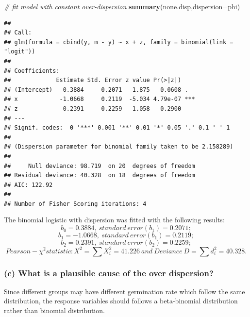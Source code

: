 \documentclass[
]{article}
\newenvironment{Shaded}{\begin{snugshade}}{\end{snugshade}}
\newcommand{\AttributeTok}[1]{\textcolor[rgb]{0.13,0.29,0.53}{#1}}
\newcommand{\CommentTok}[1]{\textcolor[rgb]{0.56,0.35,0.01}{\textit{#1}}}
\newcommand{\FunctionTok}[1]{\textcolor[rgb]{0.13,0.29,0.53}{\textbf{#1}}}
\newcommand{\NormalTok}[1]{#1}
\begin{document}
\begin{Shaded}
\begin{Highlighting}[]
\CommentTok{\# fit model with constant over{-}dispersion}
\FunctionTok{summary}\NormalTok{(none.disp,}\AttributeTok{dispersion=}\NormalTok{phi)}
\end{Highlighting}
\end{Shaded}

\begin{verbatim}
## 
## Call:
## glm(formula = cbind(y, m - y) ~ x + z, family = binomial(link = "logit"))
## 
## Coefficients:
##             Estimate Std. Error z value Pr(>|z|)    
## (Intercept)   0.3884     0.2071   1.875   0.0608 .  
## x            -1.0668     0.2119  -5.034 4.79e-07 ***
## z             0.2391     0.2259   1.058   0.2900    
## ---
## Signif. codes:  0 '***' 0.001 '**' 0.01 '*' 0.05 '.' 0.1 ' ' 1
## 
## (Dispersion parameter for binomial family taken to be 2.158289)
## 
##     Null deviance: 98.719  on 20  degrees of freedom
## Residual deviance: 40.328  on 18  degrees of freedom
## AIC: 122.92
## 
## Number of Fisher Scoring iterations: 4
\end{verbatim}

The binomial logistic with dispersion was fitted with the following
results: \[b_0 = 0.3884,\ standard \ error(b_1) = 0.2071;\]
\[b_1 = -1.0668,\ standard \ error(b_1) = 0.2119;\]
\[b_2 = 0.2391,\ standard \ error(b_2) = 0.2259;\]
\[Pearson-\chi^2 statistic: X^2 = \sum X_i^2 = 41.226 \ and\ Deviance \ D = \sum d_i^2 = 40.328.\]

\hypertarget{c-what-is-a-plausible-cause-of-the-over-dispersion}{%
\subsubsection{(c) What is a plausible cause of the over
dispersion?}\label{c-what-is-a-plausible-cause-of-the-over-dispersion}}

Since different groups may have different germination rate which follow
the same distribution, the response variables should follows a
beta-binomial distribution rather than binomial distribution.
\end{document}
